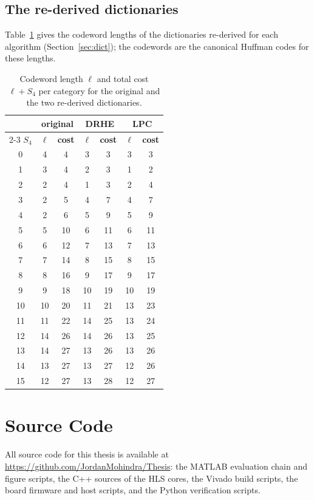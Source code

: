\section*{The re-derived dictionaries}

Table~\ref{tab:rederived} gives the codeword lengths of the dictionaries
re-derived for each algorithm (Section~\ref{sec:dict}); the codewords are the
canonical Huffman codes for these lengths.

\begin{table}[h]
\centering
\caption[The re-derived dictionaries]{Codeword length $\ell$ and total cost
$\ell + S_4$ per category for the original and the two re-derived dictionaries.}
\label{tab:rederived}
\small
\begin{tabular}{c|c|c|c|c|c|c}
& \multicolumn{2}{c|}{\textbf{original}} & \multicolumn{2}{c|}{\textbf{DRHE}} & \multicolumn{2}{c}{\textbf{LPC}}\\
\cline{2-3}\cline{4-5}\cline{6-7}
\textbf{$S_4$} & \textbf{$\ell$} & \textbf{cost} & \textbf{$\ell$} & \textbf{cost} & \textbf{$\ell$} & \textbf{cost}\\
\hline
0 & 4 & 4 & 3 & 3 & 3 & 3\\
1 & 3 & 4 & 2 & 3 & 1 & 2\\
2 & 2 & 4 & 1 & 3 & 2 & 4\\
3 & 2 & 5 & 4 & 7 & 4 & 7\\
4 & 2 & 6 & 5 & 9 & 5 & 9\\
5 & 5 & 10 & 6 & 11 & 6 & 11\\
6 & 6 & 12 & 7 & 13 & 7 & 13\\
7 & 7 & 14 & 8 & 15 & 8 & 15\\
8 & 8 & 16 & 9 & 17 & 9 & 17\\
9 & 9 & 18 & 10 & 19 & 10 & 19\\
10 & 10 & 20 & 11 & 21 & 13 & 23\\
11 & 11 & 22 & 14 & 25 & 13 & 24\\
12 & 14 & 26 & 14 & 26 & 13 & 25\\
13 & 14 & 27 & 13 & 26 & 13 & 26\\
14 & 13 & 27 & 13 & 27 & 12 & 26\\
15 & 12 & 27 & 13 & 28 & 12 & 27\\
\end{tabular}
\end{table}

\chapter{Source Code}
\label{app:code}

All source code for this thesis is available at
\url{https://github.com/JordanMohindra/Thesis}: the MATLAB evaluation chain
and figure scripts, the C++ sources of the HLS cores, the Vivado build scripts,
the board firmware and host scripts, and the Python verification scripts.
